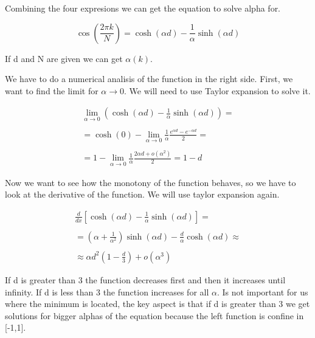 Combining the four expresions we can get the equation to solve alpha for.

\begin{equation}
  \label{5.23}
  \cos{\left(\frac{2\pi k}{N}\right)} = \cosh{(\alpha d)} - \frac{1}{\alpha} \sinh{(\alpha d)}
\end{equation}

If d and N are given we can get $\alpha(k)$.

We have to do a numerical analisis of the function in the right side. First, we want to find the limit for $\alpha \to 0$. We will need to use Taylor expansion to solve it.

\begin{equation}
  \label{5.24}
  \begin{array}{c}
    \lim_{\alpha \to 0} (\cosh{(\alpha d)} - \frac{1}{\alpha} \sinh{(\alpha d)}) =
    \\

    \\
    = \cosh{(0)} - \lim_{\alpha \to 0} \frac{1}{\alpha} \frac{e^{\alpha d}-e^{-\alpha d}}{2} =
    \\

    \\
    = 1 - \lim_{\alpha \to 0} \frac{1}{\alpha} \frac{2\alpha d + o(\alpha^2)}{2} = 1-d
  \end{array}
\end{equation}

Now we want to see how the monotony of the function behaves, so we have to look at the derivative of the function. We will use taylor expansion again.


\begin{equation}
  \label{5.25}
  \begin{array}{c}
    \frac{d}{dx}\left[\cosh{(\alpha d)} - \frac{1}{\alpha} \sinh{(\alpha d)} \right] =
    \\

    \\
    = \left(\alpha + \frac{1}{\alpha^2}\right)\sinh{(\alpha d)} -\frac{d}{\alpha}\cosh{(\alpha d)} \approx
    \\

    \\
    \approx \alpha d^2 (1-\frac{d}{3}) + o(\alpha^3)
  \end{array}
\end{equation}

If d is greater than 3 the function decreases first and then it increases until infinity. If d is less than 3 the function increases for all $\alpha$. Is not important for us where the minimum is located, the key aspect is that if d is greater than 3 we get solutions for bigger alphas of the equation because the left function is confine in [-1,1].

